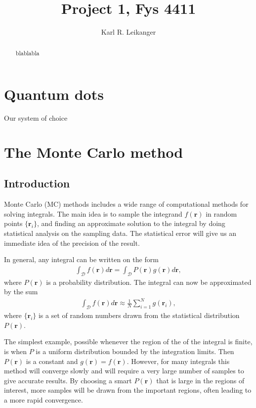 \documentclass[a4paper,10pt,twocolumn]{article} %
\title{ Project 1, Fys 4411 \\ }
\author{Karl R. Leikanger}
\newcommand{\ts}[1]{\textbf{#1}}
\begin{document}
\maketitle
\tableofcontents

\begin{abstract}%
blablabla
\end{abstract}%

\section{Quantum dots}%

Our system of choice 


\section{The Monte Carlo method}%

\subsection{Introduction}%
Monte Carlo (MC) methods includes a wide range of computational methods for solving integrals. 
The main idea is to sample the integrand $f(\ts r)$ in random points $\{\ts r_i\}$, 
and finding an approximate solution to the integral by doing statistical analysis on the sampling data. 
The statistical error will give us an immediate idea of the precision of the result.

In general, any integral can be written on the form
\begin{align}
\int_{\mathcal D} f(\ts r) d\ts r = 
\int_{\mathcal D} P(\ts r) g(\ts r) d\ts r,
\end{align} 
where $P(\ts r)$ is a probability distribution. The integral can now be approximated by the sum 
\begin{align}
	\int_{\mathcal D} f(\ts r) d\ts r 
\approx \frac1N\sum_{i=1}^Ng(\ts r_i),
\end{align} 
where $\{\ts r_i\}$ is a set of random numbers drawn from the statistical distribution $P(\ts r)$.

The simplest example, possible whenever the region of the of the integral is finite,
is when $P$ is a uniform distribution bounded by the integration limits. Then
$P(\ts r)$ is a constant and $g(\ts r)=f(\ts r)$. However, for many integrals this method 
will converge slowly and will require a very large number of samples to
give accurate results. By choosing a smart $P(\ts r)$ that is large in the regions of interest, 
more samples will be drawn from the important regions, often leading to a more rapid convergence.  
\end{document}
